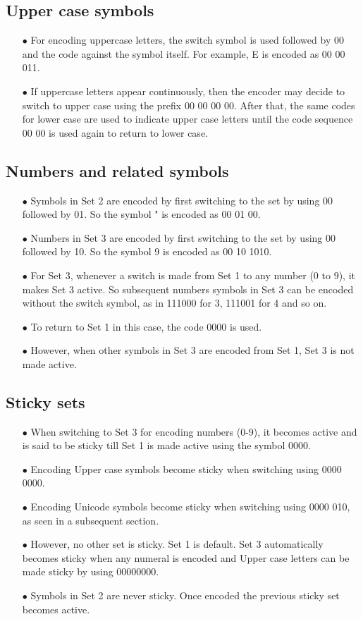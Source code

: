 \documentclass[]{article}
\begin{document}
	\subsection{Upper case symbols}
	\begin{itemize}
		\item[$\bullet$] For encoding uppercase letters, the switch symbol is used followed by 00 and the code against the symbol itself. For example, E is encoded as 00 00 011.
		\item[$\bullet$] If uppercase letters appear continuously, then the encoder may decide to switch to upper case using the prefix 00 00 00 00. After that, the same codes for lower case are used to indicate upper case letters until the code sequence 00 00 is used again to return to lower case.
	\end{itemize}
	
	\subsection{Numbers and related symbols}
	\begin{itemize}
		\item[$\bullet$] Symbols in Set 2 are encoded by first switching to the set by using 00 followed by 01. So the symbol " is encoded as 00 01 00.
		\item[$\bullet$] Numbers in Set 3 are encoded by first switching to the set by using 00 followed by 10. So the symbol 9 is encoded as 00 10 1010.
		\item[$\bullet$] For Set 3, whenever a switch is made from Set 1 to any number (0 to 9), it makes Set 3 active. So subsequent numbers symbols in Set 3 can be encoded without the switch symbol, as in 111000 for 3, 111001 for 4 and so on.
		\item[$\bullet$] To return to Set 1 in this case, the code 0000 is used.
		\item[$\bullet$] However, when other symbols in Set 3 are encoded from Set 1, Set 3 is not made active.
	\end{itemize}
	
	\subsection{Sticky sets}
	\begin{itemize}
		\item[$\bullet$] When switching to Set 3 for encoding numbers (0-9), it becomes active and is said to be sticky till Set 1 is made active using the symbol 0000.
		\item[$\bullet$] Encoding Upper case symbols become sticky when switching using 0000 0000.
		\item[$\bullet$] Encoding Unicode symbols become sticky when switching using 0000 010, as seen in a subsequent section.
		\item[$\bullet$] However, no other set is sticky. Set 1 is default. Set 3 automatically becomes sticky when any numeral is encoded and Upper case letters can be made sticky by using 00000000.
		\item[$\bullet$] Symbols in Set 2 are never sticky. Once encoded the previous sticky set becomes active.
	\end{itemize}
	
\end{document}
